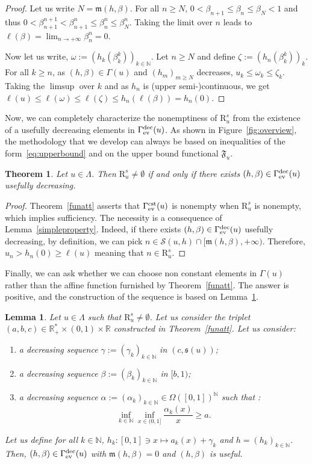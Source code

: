\documentclass{article}
\def\valu#1{\mathfrak{s}(#1)}
\def\ls#1{\boldsymbol{\ell}(#1)}
\def\funset{\Gamma}
\def\fmong{\funset_{{\rm ev}}^{\rm dec}}
\def\fset{\Omega([0,1])}
\def\fcste{\funset_{{\rm ev}}^{\rm cst}}
\def\mon{\mathfrak{m}}
\def\Fu{\mathfrak{F}_u}
\def\rr{\mathbb R}
\def\nn{\mathbb N}
\def\gls#1{{\mathrm R}_{#1}}
\def\gsls#1{\gls{#1}^s}
\def\res{\mathcal{S}}
\newtheorem{lemma}{Lemma}
\newtheorem{theorem}{Theorem}
\def\red#1{#1}
\def\blue#1{#1}
\begin{document}
	\begin{proof}
		Let us write $N=\mon(h,\beta)$. For all $n\geq N$, $0<\beta_{n+1}\leq \beta_n\leq \beta_N<1$ and thus $0<\beta_{n+1}^{n+1}<\beta_{n+1}^n\leq \beta_n^n\leq \beta_N^n$. Taking the limit over $n$ leads to $\ls{\beta}=\lim_{n\to +\infty} \beta_n^n=0$. 
		
		Now let us write, $\omega:=(h_k(\beta_k^k))_{k\in\nn}$. Let $n\geq N$ and define $\zeta:=(h_n(\beta_k^k))_k$. For all $k\geq n$, as $(h,\beta)\in\funset(u)$ and $(h_m)_{m\geq N}$ decreases, $u_k\leq \omega_k\leq \zeta_k$. Taking the $\limsup$ over $k$ and as $h_n$ is (upper semi-)continuous, we get $\ls{u}\leq \ls{\omega}\leq \ls{\zeta}\leq h_n(\ls{\beta})=h_n(0)$. 
	\end{proof}
	\blue{Now, we can completely characterize the nonemptiness of $\gsls{u}$ from the existence of a usefully decreasing elements in $\fmong(u)$. As shown in Figure~\ref{fig:overview}, the methodology that we develop can always be based on inequalities of the form~\eqref{eq:upperbound} and on the upper bound functional $\Fu$.}
	\begin{theorem}
		\label{mainthmon}
		Let $u\in\Lambda$. Then $\gsls{u}\neq \emptyset$ if and only if there exists $(h,\beta)\in\fmong(u)$ usefully decreasing. 
	\end{theorem}
	\begin{proof}
		Theorem~\ref{funatt} asserts that $\fcste(u)$ is nonempty when $\gsls{u}$ is nonempty, \red{which implies sufficiency}. The necessity is a consequence of Lemma~\ref{simpleproperty}. Indeed, if there exists $(h,\beta)\in\fmong(u)$ usefully decreasing, by definition, we can pick $n\in\res(u,h)\cap [\mon(h,\beta),+\infty)$. Therefore, $u_n>h_n(0)\geq \ls{u}$ meaning that $n\in\gsls{u}$.
	\end{proof}
	Finally, we can ask \red{whether} we \red{can choose} non constant elements in $\funset(u)$ rather than the affine function furnished by Theorem~\ref{funatt}. The answer is positive, and the construction of the sequence is based on Lemma~\ref{existence}.  
	\begin{lemma}
		\label{existence}
		Let $u\in\Lambda$ such that $\gsls{u}\neq \emptyset$. Let us consider the triplet $(a,b,c)\in \rr_+^*\times (0,1)\times \rr$ constructed in Theorem~\ref{funatt}.
		Let us consider:
		\begin{enumerate}
			\item a decreasing sequence $\gamma:=(\gamma_k)_{k\in\nn}$ in $(c,\valu{u})$;
			\item a decreasing sequence $\beta:=(\beta_k)_{k\in\nn}$ in $[b,1)$;
			\item a decreasing sequence $\alpha:=(\alpha_k)_{k\in\nn}\in \fset^\nn$ such that :
			\begin{equation}
				\label{eqalpha}
				\inf_{k\in\nn}\inf_{x\in (0,1]} \dfrac{\alpha_k(x)}{x}\geq a .
			\end{equation}
		\end{enumerate}
		Let us define for all $k\in\nn$, $h_k:[0,1]\ni x\mapsto a_k(x)+\gamma_k$ and $h=(h_k)_{k\in\nn}$. Then, $(h,\beta)\in\fmong(u)$ \blue{with $\mon(h,\beta)=0$} and $(h,\beta)$ is useful.
		
	\end{lemma}
	
\end{document}

